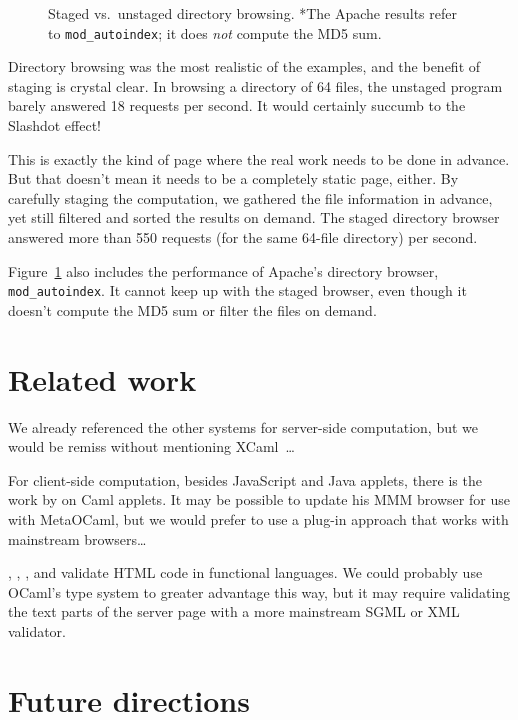 \documentclass[preprint]{acm_proc_article-sp}
\def\MOC{MetaOCaml}
\newcommand{\myfig}[3]{%
  \begin{figure}[tbp]%
    #3%
    \caption{#2}%
    \label{fig:#1}%
  \end{figure}}
\newcommand{\gnuplot}[2]{%
  \myfig{#1}{#2}{}}
\begin{document}
\gnuplot{browse}{Staged vs.~unstaged directory browsing.  *The
  Apache results refer to \texttt{mod\_autoindex}; it does
  \emph{not} compute the MD5 sum.}

Directory browsing was the most realistic of the examples, and
the benefit of staging is crystal clear.  In browsing a
directory of 64 files, the unstaged program barely answered 18
requests per second.  It would certainly succumb to the Slashdot
effect!

This is exactly the kind of page where the real work needs to be
done in advance.  But that doesn't mean it needs to be a
completely static page, either.  By carefully staging the
computation, we gathered the file information in advance, yet
still filtered and sorted the results on demand.  The staged
directory browser answered more than 550 requests (for the same
64-file directory) per second.

Figure~\ref{fig:browse} also includes the performance of
Apache's directory browser, \texttt{mod\_autoindex}.  It cannot
keep up with the staged browser, even though it doesn't compute
the MD5 sum or filter the files on demand.

\section{Related work}
\label{sec:related}

We already referenced the other systems for server-side
computation, but we would be remiss without mentioning
XCaml~\cite{baretta04xcaml}\ldots

For client-side computation, besides JavaScript and Java
applets, there is the work by \citet{rouaix96web} on Caml
applets.  It may be possible to update his MMM browser for use
with \MOC{}, but we would prefer to use a plug-in approach that
works with mainstream browsers\ldots

\citet{elsman04typing}, \citet{wallace99haxml},
\citet{hosoya03xduce}, and \citet{ohl04xhtml} validate HTML code
in functional languages.  We could probably use OCaml's type
system to greater advantage this way, but it may require
validating the text parts of the server page with a more
mainstream SGML or XML validator.

\newpage
\section{Future directions}
\label{sec:future}
\end{document}
